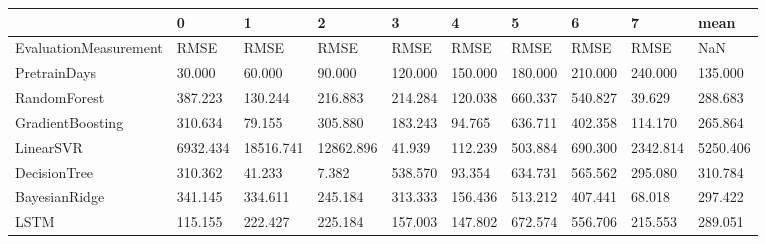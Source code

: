 \begin{tabular}{llllllllll}
\toprule
{} &        0 &         1 &         2 &       3 &       4 &       5 &       6 &        7 &     mean \\
\midrule
EvaluationMeasurement &     RMSE &      RMSE &      RMSE &    RMSE &    RMSE &    RMSE &    RMSE &     RMSE &      NaN \\
PretrainDays          &   30.000 &    60.000 &    90.000 & 120.000 & 150.000 & 180.000 & 210.000 &  240.000 &  135.000 \\
RandomForest          &  387.223 &   130.244 &   216.883 & 214.284 & 120.038 & 660.337 & 540.827 &   39.629 &  288.683 \\
GradientBoosting      &  310.634 &    79.155 &   305.880 & 183.243 &  94.765 & 636.711 & 402.358 &  114.170 &  265.864 \\
LinearSVR             & 6932.434 & 18516.741 & 12862.896 &  41.939 & 112.239 & 503.884 & 690.300 & 2342.814 & 5250.406 \\
DecisionTree          &  310.362 &    41.233 &     7.382 & 538.570 &  93.354 & 634.731 & 565.562 &  295.080 &  310.784 \\
BayesianRidge         &  341.145 &   334.611 &   245.184 & 313.333 & 156.436 & 513.212 & 407.441 &   68.018 &  297.422 \\
LSTM                  &  115.155 &   222.427 &   225.184 & 157.003 & 147.802 & 672.574 & 556.706 &  215.553 &  289.051 \\
\bottomrule
\end{tabular}
